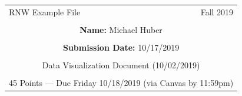 \documentclass[12pt,letterpaper,final]{article}
\begin{document}


\begin{table}\centering
\begin{tabular*}{6.15in}{@{\extracolsep{\fill}}|llr|} \hline
RNW Example File & \hspace*{0.5 in} & Fall 2019 \\
 & & \\
\multicolumn{3}{|c|}{
{\bf Name:} Michael Huber} \\
 & & \\
\multicolumn{3}{|c|}{
{\bf Submission Date:} 10/17/2019} \\
 & & \\
\multicolumn{3}{|c|}{
Data Visualization Document (10/02/2019)} \\
 & & \\
\multicolumn{3}{|c|}{
45 Points --- Due Friday 10/18/2019 (via Canvas by 11:59pm)} \\
\hline
\end{tabular*}
\end{table}


~ \newpage
\end{document}
